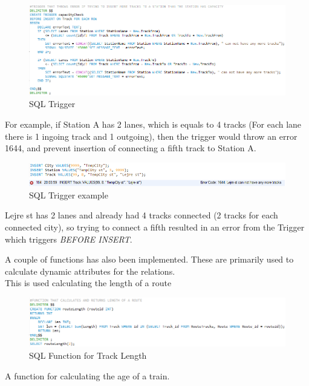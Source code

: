 \begin{figure}[ht!]
    \centering
    \includegraphics[width=1\textwidth]{img/SQL_TRIGGER}
    \caption{SQL Trigger}
    \label{fig:ER}
\end{figure}

For example, if Station A has 2 lanes, which is equals to 4 tracks (For each lane there is 1 ingoing track and 1 outgoing), then the trigger would throw an error 1644, and prevent insertion of connecting a fifth track to Station A.

\begin{figure}[ht!]
    \centering
    \includegraphics[width=1\textwidth]{img/SQL_TRIGGER_example}
    \caption{SQL Trigger example}
    \label{fig:ER}
\end{figure}

Lejre st has 2 lanes and already had 4 tracks connected (2 tracks for each connected city), so trying to connect a fifth resulted in an error from the Trigger which triggers \emph{BEFORE INSERT}.

A couple of functions has also been implemented. These are primarily used to calculate dynamic attributes for the relations.\\
This is used calculating the length of a route

\begin{figure}[ht!]
    \centering
    \includegraphics[width=1\textwidth]{img/SQL_FUNCTION_Length}
    \caption{SQL Function for Track Length}
    \label{fig:ER}
\end{figure}
\newpage

A function for calculating the age of a train.

